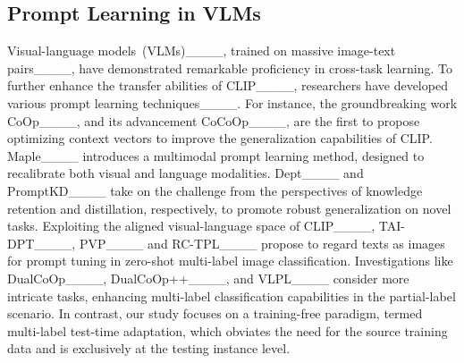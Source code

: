 \subsection{Prompt Learning in VLMs}
Visual-language models~(VLMs)____, trained on massive image-text pairs____, have demonstrated remarkable proficiency in cross-task learning. To further enhance the transfer abilities of CLIP____, researchers have developed various prompt learning techniques____. For instance, the groundbreaking work CoOp____, and its advancement CoCoOp____, are the first to propose optimizing context vectors to improve the generalization capabilities of CLIP. Maple____ introduces a multimodal prompt learning method, designed to recalibrate both visual and language modalities. Dept____ and PromptKD____ take on the challenge from the perspectives of knowledge retention and distillation, respectively, to promote robust generalization on novel tasks. Exploiting the aligned visual-language space of CLIP____, TAI-DPT____, PVP____ and RC-TPL____ propose to regard texts as images for prompt tuning in zero-shot multi-label image classification. Investigations like DualCoOp____, DualCoOp++____, and VLPL____ consider more intricate tasks, enhancing multi-label classification capabilities in the partial-label scenario. In contrast, our study focuses on a training-free paradigm, termed multi-label test-time adaptation, which obviates the need for the source training data and is exclusively at the testing instance level.